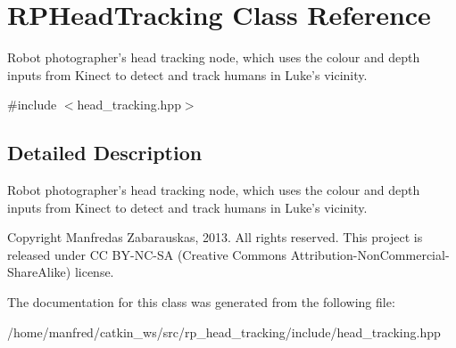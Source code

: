 \hypertarget{class_r_p_head_tracking}{\section{\-R\-P\-Head\-Tracking \-Class \-Reference}
\label{class_r_p_head_tracking}
}


\-Robot photographer's head tracking node, which uses the colour and depth inputs from \-Kinect to detect and track humans in \-Luke's vicinity.  




{\ttfamily \#include $<$head\-\_\-tracking.\-hpp$>$}



\subsection{\-Detailed \-Description}
\-Robot photographer's head tracking node, which uses the colour and depth inputs from \-Kinect to detect and track humans in \-Luke's vicinity. 

\begin{DoxyCopyright}{\-Copyright}
\-Manfredas \-Zabarauskas, 2013. \-All rights reserved. \-This project is released under \-C\-C \-B\-Y-\/\-N\-C-\/\-S\-A (\-Creative \-Commons \-Attribution-\/\-Non\-Commercial-\/\-Share\-Alike) license. 
\end{DoxyCopyright}


\-The documentation for this class was generated from the following file\-:\begin{DoxyCompactItemize}
\item 
/home/manfred/catkin\-\_\-ws/src/rp\-\_\-head\-\_\-tracking/include/head\-\_\-tracking.\-hpp\end{DoxyCompactItemize}
